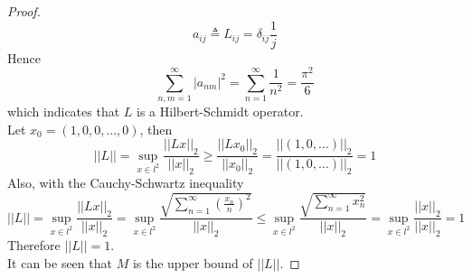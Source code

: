 \documentclass[paper=a4, fontsize=11pt]{scrartcl} %
\numberwithin{equation}{section} %
\numberwithin{figure}{section} %
\numberwithin{table}{section} %
\begin{document}
\begin{enumerate}
\begin{proof}
\begin{equation}
					a_{ij} \triangleq L_{ij} = \delta_{ij}\frac{1}{j}
				\end{equation}
				Hence
				\begin{equation}
					\sum_{n, m = 1}^{\infty} |a_{nm}|^2 = \sum_{n=1}^{\infty} \frac{1}{n^2} = \frac{\pi^2}{6}
				\end{equation}
				which indicates that $L$ is a Hilbert-Schmidt operator.\\
				Let $x_0 = (1, 0, 0, ... , 0)$, then
				\begin{equation}
					||L|| = \sup_{x \in l^2} \frac{||Lx||_2}{||x||_2} \geq \frac{||Lx_0||_2}{||x_0||_2} = \frac{||(1, 0, ...)||_2}{||(1, 0, ...)||_2} = 1
				\end{equation}
				Also, with the Cauchy-Schwartz inequality
				\begin{equation}
					||L|| = \sup_{x \in l^2} \frac{||Lx||_2}{||x||_2} = \sup_{x \in l^2} \frac{\sqrt{\sum_{n=1}^{\infty} (\frac{x_n}{n})^2}}{||x||_2} \leq \sup_{x \in l^2} \frac{\sqrt{\sum_{n=1}^{\infty} x_n^2}}{||x||_2} = \sup_{x \in l^2} \frac{||x||_2}{||x||_2} = 1
				\end{equation}
				Therefore $||L|| = 1$.\\
				It can be seen that $M$ is the upper bound of $||L||$.
			\end{proof}
		
	\end{enumerate}
\end{document}
